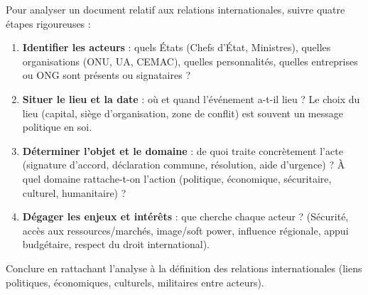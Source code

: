 \documentclass[11pt]{article}
\begin{document}
\begin{methode}
Pour analyser un document relatif aux relations internationales, suivre quatre étapes rigoureuses :
\begin{enumerate}
\item \textbf{Identifier les acteurs} : quels États (Chefs d'État, Ministres), quelles organisations (ONU, UA, CEMAC), quelles personnalités, quelles entreprises ou ONG sont présents ou signataires ?
\item \textbf{Situer le lieu et la date} : où et quand l'événement a-t-il lieu ? Le choix du lieu (capital, siège d'organisation, zone de conflit) est souvent un message politique en soi.
\item \textbf{Déterminer l'objet et le domaine} : de quoi traite concrètement l'acte (signature d'accord, déclaration commune, résolution, aide d'urgence) ? À quel domaine rattache-t-on l'action (politique, économique, sécuritaire, culturel, humanitaire) ?
\item \textbf{Dégager les enjeux et intérêts} : que cherche chaque acteur ? (Sécurité, accès aux ressources/marchés, image/soft power, influence régionale, appui budgétaire, respect du droit international).
\end{enumerate}
Conclure en rattachant l'analyse à la définition des relations internationales (liens politiques, économiques, culturels, militaires entre acteurs).
\end{methode}
\end{document}
